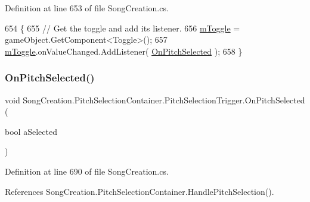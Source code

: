 Definition at line 653 of file Song\+Creation.\+cs.


\begin{DoxyCode}
654             \{
655                 \textcolor{comment}{// Get the toggle and add its listener.}
656                 \hyperlink{class_song_creation_1_1_pitch_selection_container_1_1_pitch_selection_trigger_aa289269d96356379b79d3918535561fd}{mToggle} = gameObject.GetComponent<Toggle>();
657                 \hyperlink{class_song_creation_1_1_pitch_selection_container_1_1_pitch_selection_trigger_aa289269d96356379b79d3918535561fd}{mToggle}.onValueChanged.AddListener( \hyperlink{class_song_creation_1_1_pitch_selection_container_1_1_pitch_selection_trigger_ac113e02950a228fc6c78ad5972238a98}{OnPitchSelected} );
658             \}
\end{DoxyCode}
\mbox{\label{class_song_creation_1_1_pitch_selection_container_1_1_pitch_selection_trigger_ac113e02950a228fc6c78ad5972238a98}} 
\subsubsection{\texorpdfstring{On\+Pitch\+Selected()}{OnPitchSelected()}}
{\footnotesize\ttfamily void Song\+Creation.\+Pitch\+Selection\+Container.\+Pitch\+Selection\+Trigger.\+On\+Pitch\+Selected (\begin{DoxyParamCaption}\item[{bool}]{a\+Selected }\end{DoxyParamCaption})}



Definition at line 690 of file Song\+Creation.\+cs.



References Song\+Creation.\+Pitch\+Selection\+Container.\+Handle\+Pitch\+Selection().


